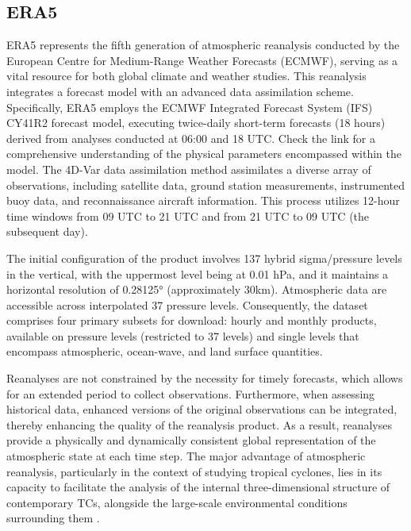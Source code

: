 \subsection{ERA5}

ERA5 \cite{hersbach2020era5} represents the fifth generation of atmospheric reanalysis conducted by the European Centre for Medium-Range Weather Forecasts (ECMWF), serving as a vital resource for both global climate and weather studies. This reanalysis integrates a forecast model with an advanced data assimilation scheme. Specifically, ERA5 employs the ECMWF Integrated Forecast System (IFS) CY41R2 forecast model, executing twice-daily short-term forecasts (18 hours) derived from analyses conducted at 06:00 and 18 UTC. Check the link %
for a comprehensive understanding of the physical parameters encompassed within the model. The 4D-Var data assimilation method assimilates a diverse array of observations, including satellite data, ground station measurements, instrumented buoy data, and reconnaissance aircraft information. This process utilizes 12-hour time windows from 09 UTC to 21 UTC and from 21 UTC to 09 UTC (the subsequent day).

The initial configuration of the product involves 137 hybrid sigma/pressure levels in the vertical, with the uppermost level being at 0.01 hPa, and it maintains a horizontal resolution of 0.28125° (approximately 30km). Atmospheric data are accessible across interpolated 37 pressure levels. Consequently, the dataset comprises four primary subsets for download: hourly and monthly products, available on pressure levels (restricted to 37 levels) and single levels that encompass atmospheric, ocean-wave, and land surface quantities.

Reanalyses are not constrained by the necessity for timely forecasts, which allows for an extended period to collect observations. Furthermore, when assessing historical data, enhanced versions of the original observations can be integrated, thereby enhancing the quality of the reanalysis product. As a result, reanalyses provide a physically and dynamically consistent global representation of the atmospheric state at each time step. The major advantage of atmospheric reanalysis, particularly in the context of studying tropical cyclones, lies in its capacity to facilitate the analysis of the internal three-dimensional structure of contemporary TCs, alongside the large-scale environmental conditions surrounding them \cite{dulac2024assessing}.

